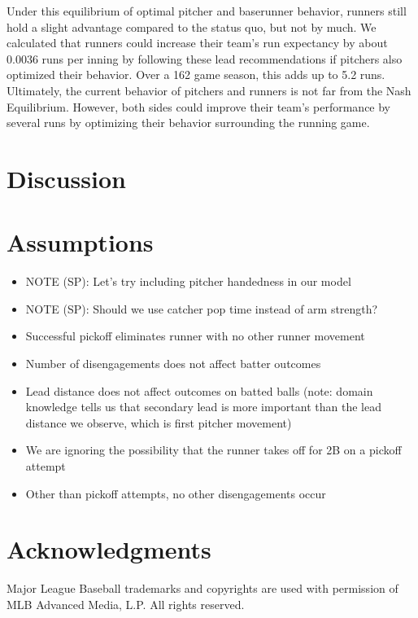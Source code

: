 \documentclass{article}
\begin{document}
      Under this equilibrium of optimal pitcher and baserunner behavior, runners still hold a slight advantage compared to the status quo, but not by much. We calculated that runners could increase their team's run expectancy by about 0.0036 runs per inning by following these lead recommendations if pitchers also optimized their behavior. Over a 162 game season, this adds up to 5.2 runs. Ultimately, the current behavior of pitchers and runners is not far from the Nash Equilibrium. However, both sides could improve their team's performance by several runs by optimizing their behavior surrounding the running game.

  \section{Discussion}

  \section{Assumptions}

    \begin{itemize}
      \item NOTE (SP): Let's try including pitcher handedness in our model
      \item NOTE (SP): Should we use catcher pop time instead of arm strength?
      \item Successful pickoff eliminates runner with no other runner movement
      \item Number of disengagements does not affect batter outcomes
      \item Lead distance does not affect outcomes on batted balls (note: domain knowledge tells us that secondary lead is more important than the lead distance we observe, which is first pitcher movement)
      \item We are ignoring the possibility that the runner takes off for 2B on a pickoff attempt
      \item Other than pickoff attempts, no other disengagements occur
    \end{itemize}

  \section{Acknowledgments}

    Major League Baseball trademarks and copyrights are used with permission of MLB Advanced Media, L.P. All rights reserved.

  \printbibliography
\end{document}
